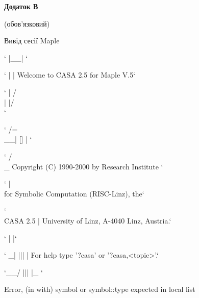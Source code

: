 \documentclass[a4paper,12pt,oneside]{article}
\begin{document}
\begin{center}
\textbf{Додаток В}

(обов'язковий)

Вивід сесії Maple
\end{center}

\pagestyle{empty}
\begin{maplegroup}
\begin{mapleinput}
\end{mapleinput}

\mapleresult
\begin{maplettyout}
`           |__| `
\end{maplettyout}

\begin{maplettyout}
`           |  |          Welcome to CASA 2.5 for Maple V.5`
\end{maplettyout}

\begin{maplettyout}
`     |   /\\|  |/\\ `
\end{maplettyout}

\begin{maplettyout}
`    /=\\__|  []  | `
\end{maplettyout}

\begin{maplettyout}
`   /            \\_       Copyright (C) 1990-2000 by Research
Institute `
\end{maplettyout}

\begin{maplettyout}
`   |              \\      for Symbolic Computation (RISC-Linz), the`
\end{maplettyout}

\begin{maplettyout}
`   \\   CASA 2.5   |      University of Linz, A-4040 Linz, Austria.`
\end{maplettyout}

\begin{maplettyout}
`    |             |`
\end{maplettyout}

\begin{maplettyout}
`   _|     |||     |      For help type '?casa' or '?casa,<topic>'.`
\end{maplettyout}

\begin{maplettyout}
`__/       |||     |_ `
\end{maplettyout}

\begin{maplettyout}
Error, (in with) symbol or symbol::type expected in local list
\end{maplettyout}

\end{maplegroup}
\end{document}
